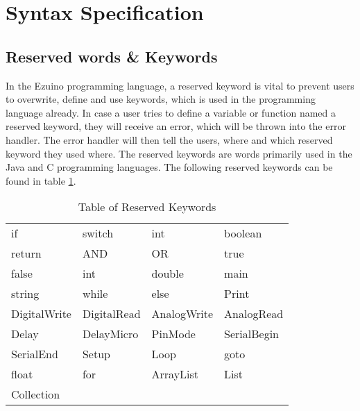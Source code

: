 \section{Syntax Specification}
\subsection{Reserved words \& Keywords}
In the Ezuino programming language, a reserved keyword is vital to prevent users to overwrite, define and use keywords, which is used in the programming language already. In case a user tries to define a variable or function named a reserved keyword, they will receive an error, which will be thrown into the error handler. The error handler will then tell the users, where and which reserved keyword they used where. The reserved keywords are words primarily used in the Java and C programming languages. The following reserved keywords can be found in table \ref{reservedKeywordsList}.

\begin{table}[H]
\centering
\caption{Table of Reserved Keywords}
\begin{tabular}{llll}
if           & switch      & int         & boolean     \\
return       & AND         & OR          & true        \\
false        & int         & double      & main        \\
string       & while       & else        & Print       \\
DigitalWrite & DigitalRead & AnalogWrite & AnalogRead  \\
Delay        & DelayMicro  & PinMode     & SerialBegin \\
SerialEnd    & Setup       & Loop        & goto        \\
float        & for         & ArrayList   & List        \\
Collection   &             &             &            
\end{tabular}
\label{reservedKeywordsList}
\end{table}